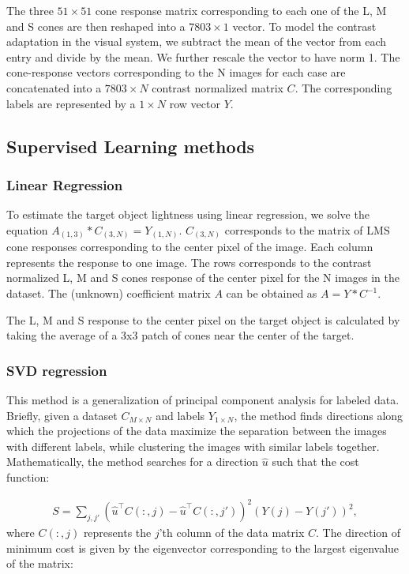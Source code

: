 \documentclass{jov}
\begin{document}
The three $51 \times 51$ cone response matrix corresponding to each one of the L, M and S cones are then reshaped into a $7803 \times 1$ vector. To model the contrast adaptation in the visual system, we subtract the mean of the vector from each entry and divide by the mean. We further rescale the vector to have norm 1. The cone-response vectors corresponding to the N images for each case are concatenated into a $7803 \times N$ contrast normalized matrix $C$. The corresponding labels are represented by a $1 \times N$ row vector $Y$.

\subsection{Supervised Learning methods} \label{method:SupervisedLearning}
\subsubsection*{Linear Regression} To estimate the target object lightness using linear regression, we solve the equation $A_{(1,3)}*C_{(3,N)} = Y_{(1,N)}$. $C_{(3,N)}$ corresponds to the matrix of LMS cone responses corresponding to the center pixel of the image. Each column represents the response to one image. The rows corresponds to the contrast normalized L, M and S cones response of the center pixel for the N images in the dataset. The (unknown) coefficient matrix $A$ can be obtained as $A = Y*C^{-1}$.

The L, M and S response to the center pixel on the target object is calculated by taking the average of a 3x3 patch of cones near the center of the target.

\subsubsection*{SVD regression}
This method is a generalization of principal component analysis for labeled data. Briefly, given a dataset $C_{M \times N}$ and labels $Y_{1\times N}$, the method finds directions along which the projections of the data maximize the separation between the images with different labels, while clustering the images with similar labels together. Mathematically, the method searches for a direction $\hat{u}$ such that the cost function:

\begin{align}
S = \sum\limits_{j,j'}\left(\hat{u}^\intercal C(:,j) - \hat{u}^\intercal C(:,j')\right)^2 \left(Y(j)-Y(j') \right)^2,
\end{align} 
where $C(:,j)$ represents the $j$'th column of the data matrix $C$. The direction of minimum cost is given by the eigenvector corresponding to the largest eigenvalue of the matrix:
\end{document}
